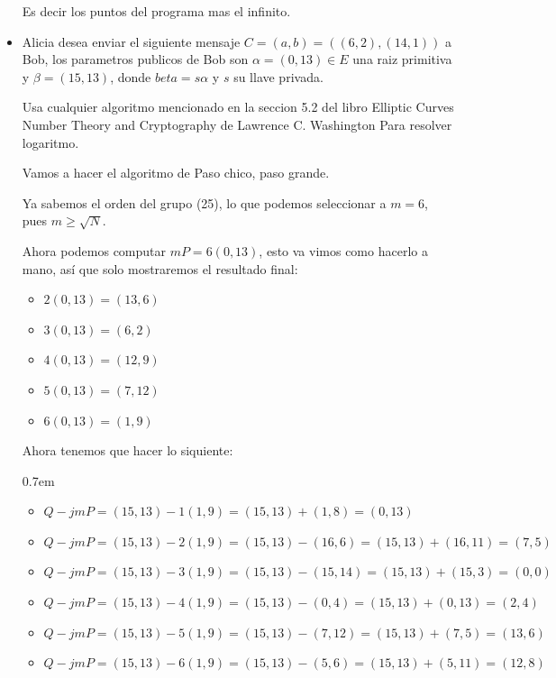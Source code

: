 \documentclass[12pt, fleqn]{report}                             %
\newenvironment{SmallIndentation}[1][0.75em]                    %
        {\begin{adjustwidth}{#1}{}\begin{footnotesize}}             %
        {\end{footnotesize}\end{adjustwidth}}                       %
\theoremstyle{break}                                            %
\begin{document}
\begin{itemize}
      Es decir los puntos del programa mas el infinito.

    \item 
      Alicia desea enviar el siguiente mensaje 
      $C = (a, b) = ((6, 2),(14, 1))$ a Bob, los parametros
      publicos de Bob son $\alpha = (0, 13) \in E$ una raiz 
      primitiva y $\beta = (15, 13)$, donde $beta = s\alpha$ 
      y $s$ su llave privada. 
      
      Usa cualquier algoritmo mencionado en la seccion 5.2 
      del libro Elliptic Curves Number Theory and Cryptography 
      de Lawrence C. Washington Para resolver logaritmo.


      Vamos a hacer el algoritmo de Paso chico, paso grande.

      Ya sabemos el orden del grupo (25), lo que podemos seleccionar
      a $m = 6$, pues $m \geq \sqrt{N}$.

      Ahora podemos computar $mP =  6(0, 13)$, esto va vimos como hacerlo a mano,
      así que solo mostraremos el resultado final:

      \begin{itemize}
        \item $2(0, 13) = (13, 6)$
        \item $3(0, 13) = (6, 2)$
        \item $4(0, 13) = (12, 9)$
        \item $5(0, 13) = (7, 12)$
        \item $6(0, 13) = (1, 9)$
      \end{itemize}

      Ahora tenemos que hacer lo siquiente:
     \begin{SmallIndentation}[0.7em]
      \begin{itemize}
        \item $Q - jmP 
          = (15, 13) - 1(1, 9)
          = (15, 13) + (1, 8)
          = (0, 13)
          $
        \item $Q - jmP 
          = (15, 13) - 2(1, 9)
          = (15, 13) - (16, 6)
          = (15, 13) + (16, 11)
          = (7, 5)
          $
        \item $Q - jmP 
          = (15, 13) - 3(1, 9)
          = (15, 13) - (15, 14)
          = (15, 13) + (15, 3)
          = (0, 0)
          $
        \item $Q - jmP 
          = (15, 13) - 4(1, 9)
          = (15, 13) - (0, 4)
          = (15, 13) + (0, 13)
          = (2, 4)
          $
        \item $Q - jmP 
          = (15, 13) - 5(1, 9)
          = (15, 13) - (7, 12)
          = (15, 13) + (7, 5)
          = (13, 6)
          $
        \item $Q - jmP 
          = (15, 13) - 6(1, 9)
          = (15, 13) - (5, 6)
          = (15, 13) + (5, 11)
          = (12, 8)
          $
      \end{itemize}
    \end{SmallIndentation}


\end{itemize}
\end{document}
